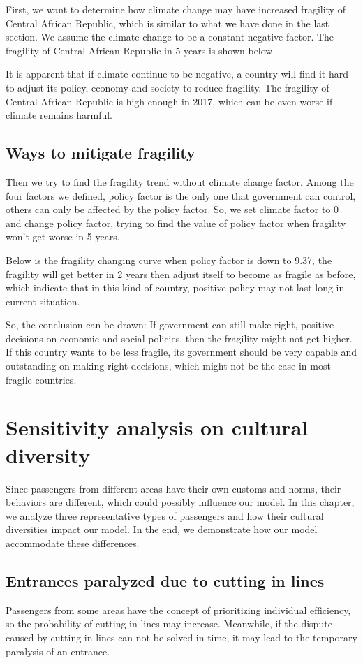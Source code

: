 \documentclass{mcmthesis}
\begin{document}
	First, we want to determine how climate change may have increased fragility of Central African Republic, which is similar to what we have done in the last section. We assume the climate change to be a constant negative factor. The fragility of Central African Republic in 5 years is shown below
	
	It is apparent that if climate continue to be negative, a country will find it hard to adjust its policy, economy and society to reduce fragility. The fragility of Central African Republic is high enough in 2017, which can be even worse if climate remains harmful.


	\subsection{Ways to mitigate fragility}
	Then we try to find the fragility trend without climate change factor. Among the four factors we defined, policy factor is the only one that government can control, others can only be affected by the policy factor. So, we set climate factor to 0 and change policy factor, trying to find the value of policy factor when fragility won’t get worse in 5 years.
	
	Below is the fragility changing curve when policy factor is down to 9.37, the fragility will get better in 2 years then adjust itself to become as fragile as before, which indicate that in this kind of country, positive policy may not last long in current situation.
	
	So, the conclusion can be drawn: If government can still make right, positive decisions on economic and social policies, then the fragility might not get higher. If this country wants to be less fragile, its government should be very capable and outstanding on making right decisions, which might not be the case in most fragile countries.

	\section{Sensitivity analysis on cultural diversity}
	Since passengers from different areas have their own customs and norms, their behaviors are different, which could possibly influence our model. In this chapter, we analyze three representative types of passengers and how their cultural diversities impact our model. In the end, we demonstrate how our model accommodate these differences. 
	\subsection{Entrances paralyzed due to cutting in lines}
	Passengers from some areas have the concept of prioritizing individual efficiency, so the probability of cutting in lines may increase. Meanwhile, if the dispute caused by cutting in lines can not be solved in time, it may lead to the temporary paralysis of an entrance.
	
\end{document}
